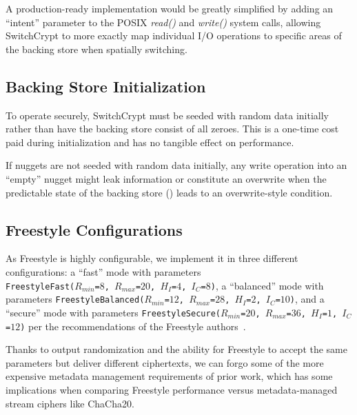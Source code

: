 A production-ready implementation would be greatly simplified by adding an
``intent'' parameter to the POSIX \textit{read()} and \textit{write()} system
calls, allowing SwitchCrypt to more exactly map individual I/O operations to
specific areas of the backing store when spatially switching.  

\subsection{Backing Store Initialization}

To operate securely, SwitchCrypt must be seeded with random data initially rather
than have the backing store consist of all zeroes. This is a one-time cost paid
during initialization and has no tangible effect on performance.

If nuggets are not seeded with random data initially, any write operation into
an ``empty'' nugget might leak information or constitute an overwrite when the
predictable state of the backing store () leads to
an overwrite-style condition.

\subsection{Freestyle Configurations}

As Freestyle is highly configurable, we implement it in three different
configurations: a ``fast'' mode with parameters
\\\texttt{FreestyleFast($R_{min}$=$8$, $R_{max}$=$20$, $H_I$=$4$, $I_C$=$8$)}, a
``balanced'' mode with parameters \texttt{FreestyleBalanced($R_{min}$=$12$,
$R_{max}$=$28$, $H_I$=$2$, $I_C$=$10$)}, and a ``secure'' mode with parameters
\texttt{FreestyleSecure($R_{min}$=$20$, $R_{max}$=$36$, $H_I$=$1$,
$I_C$=$12$)} per the recommendations of the Freestyle authors~\cite{Freestyle}.

Thanks to output randomization and the ability for Freestyle to accept the same
parameters but deliver different ciphertexts, we can forgo some of the more
expensive metadata management requirements of prior work, which has some
implications when comparing Freestyle performance versus metadata-managed stream
ciphers like ChaCha20.
